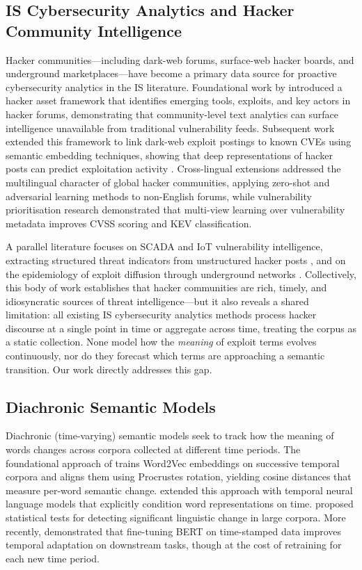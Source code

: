 \documentclass[12pt]{article}
\begin{document}
\subsection{IS Cybersecurity Analytics and Hacker Community Intelligence}

Hacker communities---including dark-web forums, surface-web hacker boards, and underground marketplaces---have become a primary data source for proactive cybersecurity analytics in the IS literature. Foundational work by \textcite{samtani2017} introduced a hacker asset framework that identifies emerging tools, exploits, and key actors in hacker forums, demonstrating that community-level text analytics can surface intelligence unavailable from traditional vulnerability feeds. Subsequent work extended this framework to link dark-web exploit postings to known CVEs using semantic embedding techniques, showing that deep representations of hacker posts can predict exploitation activity \parencite{samtani2022}. Cross-lingual extensions \parencite{ebrahimi2022} addressed the multilingual character of global hacker communities, applying zero-shot and adversarial learning methods to non-English forums, while vulnerability prioritisation research \parencite{ullman2024} demonstrated that multi-view learning over vulnerability metadata improves CVSS scoring and KEV classification.

A parallel literature focuses on SCADA and IoT vulnerability intelligence, extracting structured threat indicators from unstructured hacker posts \parencite{samtani2020}, and on the epidemiology of exploit diffusion through underground networks \parencite{nunes2016, tavabi2018}. Collectively, this body of work establishes that hacker communities are rich, timely, and idiosyncratic sources of threat intelligence---but it also reveals a shared limitation: all existing IS cybersecurity analytics methods process hacker discourse at a single point in time or aggregate across time, treating the corpus as a static collection. None model how the \textit{meaning} of exploit terms evolves continuously, nor do they forecast which terms are approaching a semantic transition. Our work directly addresses this gap.

\subsection{Diachronic Semantic Models}

Diachronic (time-varying) semantic models seek to track how the meaning of words changes across corpora collected at different time periods. The foundational approach of \textcite{hamilton2016} trains Word2Vec embeddings \parencite{mikolov2013} on successive temporal corpora and aligns them using Procrustes rotation, yielding cosine distances that measure per-word semantic change. \textcite{kim2014} extended this approach with temporal neural language models that explicitly condition word representations on time. \textcite{kulkarni2015} proposed statistical tests for detecting significant linguistic change in large corpora. More recently, \textcite{rottger2021} demonstrated that fine-tuning BERT \parencite{devlin2019} on time-stamped data improves temporal adaptation on downstream tasks, though at the cost of retraining for each new time period.
\end{document}
